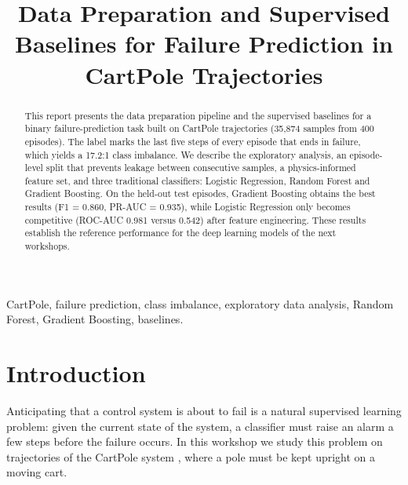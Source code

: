 \documentclass[conference]{IEEEtran}
\begin{document}
\title{Data Preparation and Supervised Baselines for Failure Prediction in CartPole Trajectories}

\author{
\and
{}
\and
{}
}

\maketitle

\begin{abstract}
This report presents the data preparation pipeline and the supervised baselines
for a binary failure-prediction task built on CartPole trajectories
(35,874 samples from 400 episodes). The label marks the last five steps of every
episode that ends in failure, which yields a 17.2:1 class imbalance. We describe the
exploratory analysis, an episode-level split that prevents leakage between
consecutive samples, a physics-informed feature set, and three traditional
classifiers: Logistic Regression, Random Forest and Gradient Boosting. On the held-out
test episodes, Gradient Boosting obtains the best results (F1 = 0.860, PR-AUC = 0.935),
while Logistic Regression only becomes competitive (ROC-AUC 0.981 versus 0.542) after
feature engineering. These results establish the reference performance for the
deep learning models of the next workshops.
\end{abstract}

\begin{IEEEkeywords}
CartPole, failure prediction, class imbalance, exploratory data analysis, Random Forest, Gradient Boosting, baselines.
\end{IEEEkeywords}

\section{Introduction}
Anticipating that a control system is about to fail is a natural supervised learning
problem: given the current state of the system, a classifier must raise an alarm a few
steps before the failure occurs. In this workshop we study this problem on trajectories of
the CartPole system \cite{barto1983}, where a pole must be kept upright on a moving cart.
\end{document}
